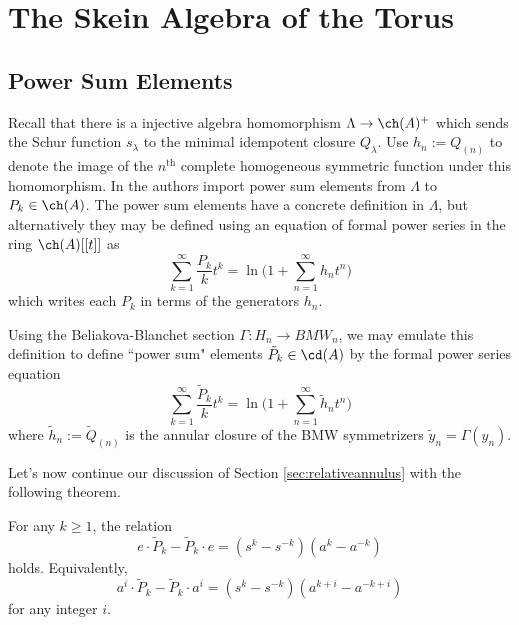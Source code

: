 \chapter{The Skein Algebra of the Torus}





\section{Power Sum Elements}

Recall that there is a injective algebra homomorphism $\Lambda \to \ch(A)^+$ which sends the Schur function $s_\lambda$ to the minimal idempotent closure $Q_\lambda$. Use $h_n := Q_{(n)}$ to denote the image of the $n^\textrm{th}$ complete homogeneous symmetric function under this homomorphism. In  the authors import power sum elements from $\Lambda$ to $P_k \in \ch(A)$. The power sum elements have a concrete definition in $\Lambda$, but alternatively they may be defined using an equation of formal power series in the ring $\ch(A)[[t]]$ as
\begin{equation}
\sum_{k=1}^\infty \frac{P_k}{k} t^k = \ln \Bigg( 1 + \sum_{n=1}^\infty h_n t^n \Bigg)
\end{equation}
which writes each $P_k$ in terms of the generators $h_n$. 

Using the Beliakova-Blanchet section $\Gamma: H_n \to BMW_n$, we may emulate this definition to define ``power sum" elements $\tilde{P}_k \in \cd(A)$ by the formal power series equation
\begin{equation}
\sum_{k=1}^\infty \frac{\tilde{P}_k}{k} t^k = \ln \Bigg( 1 + \sum_{n=1}^\infty \tilde{h}_n t^n \Bigg)
\end{equation}
where $\tilde{h}_n := \tilde{Q}_{(n)}$ is the annular closure of the BMW symmetrizers $\tilde{y}_n = \Gamma(y_n)$.

Let's now continue our discussion of Section \ref{sec:relativeannulus} with the following theorem.

\begin{theorem} \label{thm:powersumcommutator}
For any $k \geq 1$, the relation
\begin{equation} \label{eq:powersumcommutator}
e \cdot \tilde{P}_k - \tilde{P}_k \cdot e = (s^k - s^{-k}) (a^k - a^{-k})
\end{equation}
holds. Equivalently,
\begin{equation}
a^i \cdot \tilde{P}_k - \tilde{P}_k \cdot a^i = (s^k - s^{-k}) (a^{k+i} - a^{-k+i})
\end{equation}
for any integer $i$.
\end{theorem}

